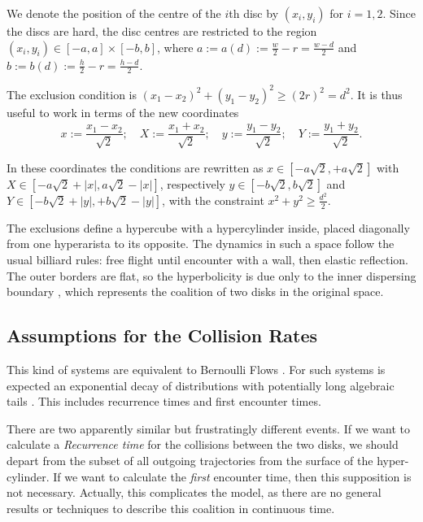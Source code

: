 \documentclass[a4paper,10pt]{article}
\newcommand{\defeq}{:=}
\begin{document}
We denote the position of the centre of the $i$th disc by 
$(x_{i}, y_{i})$ for $i=1,2$. Since the discs are hard, 
the disc centres are restricted to the region 
$(x_i, y_i) \in [-a,a] \times [-b, b]$, where 
$a \defeq a(d) \defeq \frac{w}{2} - r = \frac{w-d}{2}$ and
 $b \defeq b(d) \defeq \frac{h}{2} - r = \frac{h-d}{2}$.


The exclusion condition is $(x_1-x_2)^2 + (y_1-y_2)^2 \ge (2r)^2 = d^2$.
It is thus useful to work in terms of the new coordinates
\begin{equation}\label{cambiocoor01}
 x \defeq \frac{x_1 - x_2}{\sqrt{2}}; 
\quad X \defeq \frac{x_1 + x_2}{\sqrt{2}}; 
\quad y \defeq \frac{y_1 - y_2}{\sqrt{2}}; 
\quad Y \defeq \frac{y_1 + y_2}{\sqrt{2}}.
\end{equation}


In these coordinates the conditions are rewritten as
$x \in [-a \sqrt{2}, +a \sqrt{2}]$ with 
$X \in [-a \sqrt{2} + |x|, a \sqrt{2} - |x|]$, respectively 
 $y \in [-b \sqrt{2}, b \sqrt{2}]$ and $Y \in [-b \sqrt{2} + |y|, +b \sqrt{2} - |y|]$,  
with the constraint $x^2 + y^2 \ge \frac{d^2}{2}$.

The exclusions define a hypercube with a hypercylinder inside, placed diagonally 
from one hyperarista to its opposite. 
The dynamics in such a space follow
the usual billiard rules: free flight until
encounter with a wall, then elastic reflection.
The outer borders are flat, so the
hyperbolicity is due only to the inner dispersing
boundary \cite{Sim99}, which represents the coalition of
two disks in the original space.


\subsection{Assumptions for the Collision Rates}

This kind of systems are equivalent to Bernoulli Flows \cite{Gallavotti74}.
For such systems is expected an exponential decay of 
distributions \cite{AbadiGalves} with potentially
long algebraic tails \cite{ZasTip}. 
This includes recurrence times and
first encounter times. 

There are two apparently similar but frustratingly different events.
If we want to calculate a \emph{Recurrence time} for the collisions 
between the two disks, 
we should depart from the subset of all outgoing trajectories from the surface of the
hyper-cylinder. 
If we want to calculate the \emph{first} encounter time, then
this supposition is not necessary.
 Actually, this complicates
the model, as there are no general results or 
techniques to describe this coalition in continuous time. 
\end{document}
